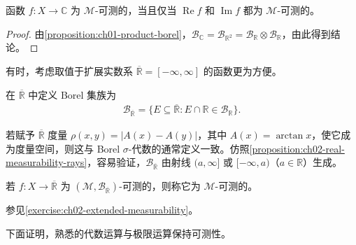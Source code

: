 \documentclass[../../main.tex]{subfiles}%
\begin{document}
\begin{corollary}\label{corollary:ch02-complex-measurability}
函数 $f:X\to\mathbb{C}$ 为 $\mathscr{M}$-可测的，当且仅当 $\operatorname{Re}f$ 和 $\operatorname{Im}f$ 都为 $\mathscr{M}$-可测的。
\end{corollary}
\begin{proof}
由\cref{proposition:ch01-product-borel}，$\mathscr{B}_{\mathbb{C}}=\mathscr{B}_{\mathbb{R}^2}=\mathscr{B}_{\mathbb{R}}\otimes\mathscr{B}_{\mathbb{R}}$，由此得到结论。
\end{proof}

有时，考虑取值于扩展实数系 $\overline{\mathbb{R}}=[-\infty,\infty]$ 的函数更为方便。
\begin{definition}\label{definition:ch02-extended-real-borel}
在 $\overline{\mathbb{R}}$ 中定义 Borel 集族为
\begin{align*}
\mathscr{B}_{\overline{\mathbb{R}}}=\{E\subseteq\overline{\mathbb{R}}:E\cap\mathbb{R}\in\mathscr{B}_{\mathbb{R}}\}.
\end{align*}
\end{definition}
\begin{remark}
若赋予 $\overline{\mathbb{R}}$ 度量 $\rho(x,y)=|A(x)-A(y)|$，其中 $A(x)=\arctan x$，使它成为度量空间，则这与 Borel $\sigma$-代数的通常定义一致。仿照\cref{proposition:ch02-real-measurability-rays}，容易验证，$\mathscr{B}_{\overline{\mathbb{R}}}$ 由射线 $(a,\infty]$ 或 $[-\infty,a)$（$a\in\mathbb{R}$）生成。
\end{remark}
\begin{definition}[扩展实值可测函数]\label{definition:ch02-extended-real-measurable}
若 $f:X\to\overline{\mathbb{R}}$ 为 $(\mathscr{M},\mathscr{B}_{\overline{\mathbb{R}}})$-可测的，则称它为 $\mathscr{M}$-可测的。
\end{definition}
参见\cref{exercise:ch02-extended-measurability}。

下面证明，熟悉的代数运算与极限运算保持可测性。
\end{document}
